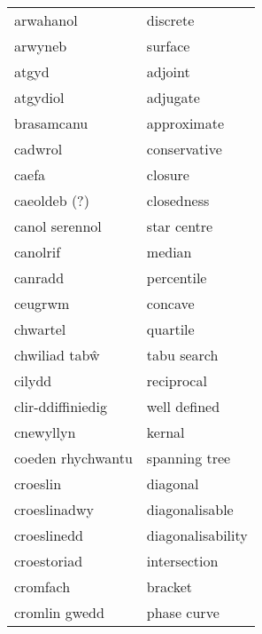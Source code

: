 \begin{supertabular}{p{0.22\textwidth}p{0.22\textwidth}}
                       arwahanol &                          discrete \\
                         arwyneb &                           surface \\
                           atgyd &                           adjoint \\
                        atgydiol &                          adjugate \\
                      brasamcanu &                       approximate \\
                         cadwrol &                      conservative \\
                           caefa &                           closure \\
                    caeoldeb (?) &                        closedness \\
                  canol serennol &                       star centre \\
                        canolrif &                            median \\
                         canradd &                        percentile \\
                         ceugrwm &                           concave \\
                        chwartel &                          quartile \\
                   chwiliad tabŵ &                       tabu search \\
                          cilydd &                        reciprocal \\
               clir-ddiffiniedig &                      well defined \\
                       cnewyllyn &                            kernal \\
               coeden rhychwantu &                     spanning tree \\
                        croeslin &                          diagonal \\
                    croeslinadwy &                    diagonalisable \\
                     croeslinedd &                 diagonalisability \\
                     croestoriad &                      intersection \\
                        cromfach &                           bracket \\
                   cromlin gwedd &                       phase curve \\

\end{supertabular}
